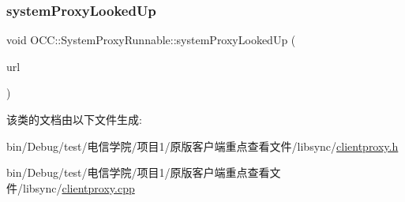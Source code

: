 \subsubsection{\texorpdfstring{system\+Proxy\+Looked\+Up}{systemProxyLookedUp}}
{\footnotesize\ttfamily void O\+C\+C\+::\+System\+Proxy\+Runnable\+::system\+Proxy\+Looked\+Up (\begin{DoxyParamCaption}\item[{const Q\+Network\+Proxy \&}]{url }\end{DoxyParamCaption})\hspace{0.3cm}{\ttfamily [signal]}}



该类的文档由以下文件生成\+:\begin{DoxyCompactItemize}
\item 
bin/\+Debug/test/电信学院/项目1/原版客户端重点查看文件/libsync/\hyperlink{clientproxy_8h}{clientproxy.\+h}\item 
bin/\+Debug/test/电信学院/项目1/原版客户端重点查看文件/libsync/\hyperlink{clientproxy_8cpp}{clientproxy.\+cpp}\end{DoxyCompactItemize}
